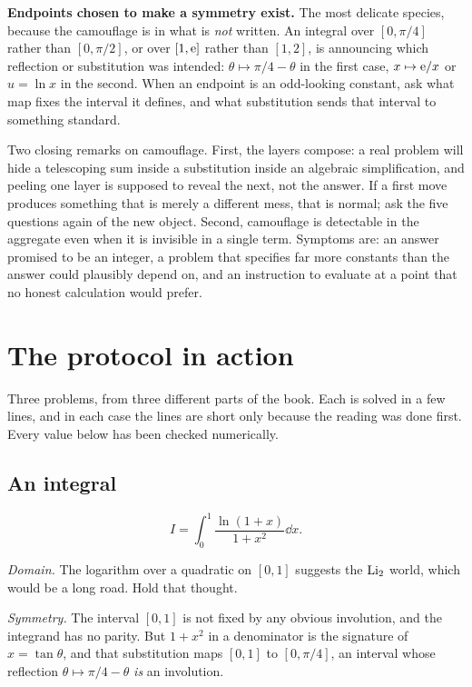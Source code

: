 \textbf{Endpoints chosen to make a symmetry exist.} The most delicate species, because the camouflage is in what is \emph{not} written. An integral over $[0,\pi/4]$ rather than $[0,\pi/2]$, or over $[1,\mathrm{e}]$ rather than $[1,2]$, is announcing which reflection or substitution was intended: $\theta\mapsto \pi/4-\theta$ in the first case, $x\mapsto \mathrm{e}/x$ or $u=\ln x$ in the second. When an endpoint is an odd-looking constant, ask what map fixes the interval it defines, and what substitution sends that interval to something standard.

Two closing remarks on camouflage. First, the layers compose: a real problem will hide a telescoping sum inside a substitution inside an algebraic simplification, and peeling one layer is supposed to reveal the next, not the answer. If a first move produces something that is merely a different mess, that is normal; ask the five questions again of the new object. Second, camouflage is detectable in the aggregate even when it is invisible in a single term. Symptoms are: an answer promised to be an integer, a problem that specifies far more constants than the answer could plausibly depend on, and an instruction to evaluate at a point that no honest calculation would prefer.

\section{The protocol in action}

Three problems, from three different parts of the book. Each is solved in a few lines, and in each case the lines are short only because the reading was done first. Every value below has been checked numerically.

\subsection{An integral}

\[
I=\int_{0}^{1}\frac{\ln(1+x)}{1+x^{2}}\dd x .
\]

\emph{Domain.} The logarithm over a quadratic on $[0,1]$ suggests the $\operatorname{Li}_{2}$ world, which would be a long road. Hold that thought.

\emph{Symmetry.} The interval $[0,1]$ is not fixed by any obvious involution, and the integrand has no parity. But $1+x^{2}$ in a denominator is the signature of $x=\tan\theta$, and that substitution maps $[0,1]$ to $[0,\pi/4]$, an interval whose reflection $\theta\mapsto \pi/4-\theta$ \emph{is} an involution.

